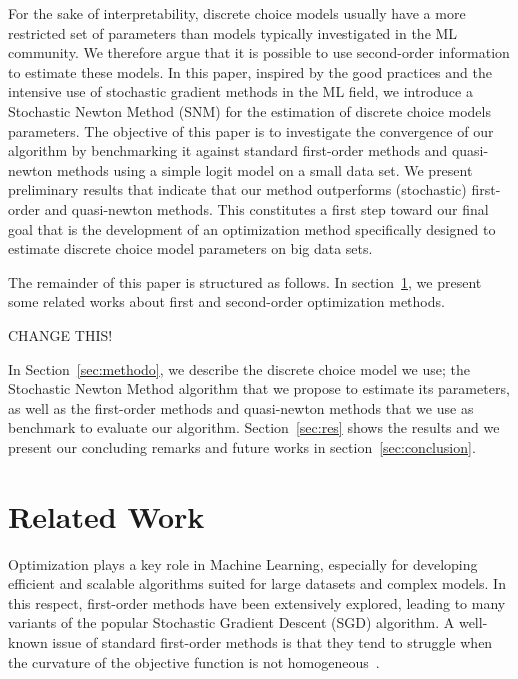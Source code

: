 \documentclass[conference]{IEEEtran}
\begin{document}
For the sake of interpretability, discrete choice models usually have a more restricted set of parameters than models typically investigated in the ML community. We therefore argue that it is possible to use second-order information to estimate these models. In this paper, inspired by the good practices and the intensive use of stochastic gradient methods in the ML field, we introduce a Stochastic Newton Method (SNM) for the estimation of discrete choice models parameters. The objective of this paper is to investigate the convergence of our algorithm by benchmarking it against standard first-order methods and quasi-newton methods using a simple logit model on a small data set. We present preliminary results that indicate that our method outperforms (stochastic) first-order and quasi-newton methods. This constitutes a first step toward our final goal that is the development of an optimization method specifically designed to estimate discrete choice model parameters on big data sets. %

The remainder of this paper is structured as follows. In section~\ref{sec:rel_work}, we present some related works about first and second-order optimization methods. 

{\large \color{red} CHANGE THIS!}

In Section~\ref{sec:methodo}, we describe the discrete choice model we use; the Stochastic Newton Method algorithm that we propose to estimate its parameters, as well as the first-order methods and quasi-newton methods that we use as benchmark to evaluate our algorithm. Section~\ref{sec:res} shows the results and we present our concluding remarks and future works in section~\ref{sec:conclusion}. 

\section{Related Work}
\label{sec:rel_work}

Optimization plays a key role in Machine Learning, especially for developing efficient and scalable algorithms suited for large datasets and complex models. In this respect, first-order methods have been extensively explored, leading to many variants of the popular Stochastic Gradient Descent (SGD) algorithm. A well-known issue of standard first-order methods is that they tend to struggle when the curvature of the objective function is not homogeneous~\cite{sutton_two_1986}.
\end{document}
